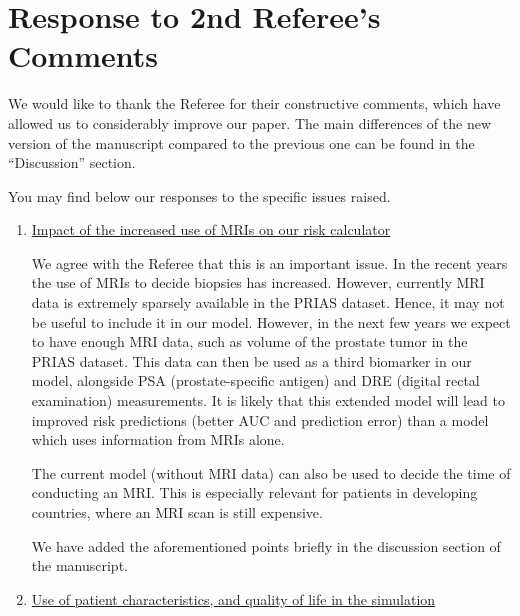 \clearpage
\section*{Response to 2nd Referee's Comments}
We would like to thank the Referee for their constructive comments, which have allowed us to considerably improve our paper. The main differences of the new version of the manuscript compared to the previous one can be found in the ``Discussion'' section.

You may find below our responses to the specific issues raised.

\begin{enumerate}
    \item \underline{Impact of the increased use of MRIs on our risk calculator}

    We agree with the Referee that this is an important issue. In the recent years the use of MRIs to decide biopsies has increased. However, currently MRI data is extremely sparsely available in the PRIAS dataset. Hence, it may not be useful to include it in our model. However, in the next few years we expect to have enough MRI data, such as volume of the prostate tumor in the PRIAS dataset. This data can then be used as a third biomarker in our model, alongside PSA (prostate-specific antigen) and DRE (digital rectal examination) measurements. It is likely that this extended model will lead to improved risk predictions (better AUC and prediction error) than a model which uses information from MRIs alone. 

    The current model (without MRI data) can also be used to decide the time of conducting an MRI. This is especially relevant for patients in developing countries, where an MRI scan is still expensive.

    We have added the aforementioned points briefly in the discussion section of the manuscript.

    \item \underline{Use of patient characteristics, and quality of life in the simulation}


\end{enumerate}
